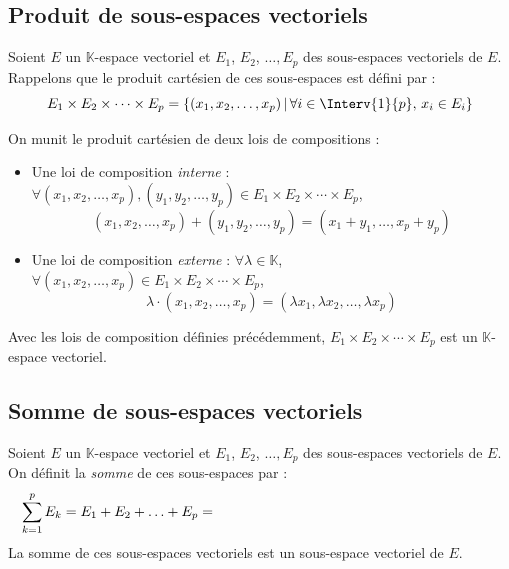 \documentclass[a4paper,10pt]{report}
\begin{document}
\subsection{Produit de sous-espaces vectoriels}

Soient $E$ un $\mathbb{K}$-espace vectoriel et $E_1$, $E_2$, $\ldots, E_p$ des sous-espaces vectoriels de $E$. Rappelons que le produit cartésien de ces sous-espaces est défini par :
$$ E_1 \times E_2 \times \cdots \times E_p = \left\lbrace (x_1, x_2, \ldots, x_p) \, \vert \, \forall i \in \Interv{1}{p}, \, x_i \in E_i \right\rbrace$$

On munit le produit cartésien de deux lois de compositions :

\begin{itemize}
\item Une loi de composition \emph{interne} : $\forall (x_1, x_2, \ldots, x_p), (y_1, y_2, \ldots, y_p) \in E_1 \times E_2 \times \cdots \times E_p$,
$$ (x_1, x_2, \ldots, x_p) + (y_1, y_2, \ldots, y_p) = (x_1+y_1, \ldots, x_p + y_p)$$
\item Une loi de composition \emph{externe} : $\forall \lambda \in \mathbb{K}$, $\forall (x_1, x_2, \ldots, x_p) \in E_1 \times E_2 \times \cdots \times E_p$,
$$ \lambda \cdot (x_1, x_2, \ldots, x_p) = (\lambda x_1, \lambda x_2, \ldots, \lambda x_p)$$
\end{itemize}

\begin{Proposition}{}
Avec les lois de composition définies précédemment, $E_1 \times E_2 \times \cdots \times E_p$ est un $\mathbb{K}$-espace vectoriel.
\end{Proposition}







\subsection{Somme de sous-espaces vectoriels}

\begin{TheoremeDefinition}{}
Soient $E$ un $\mathbb{K}$-espace vectoriel et $E_1$, $E_2$, $\ldots, E_p$ des sous-espaces vectoriels de $E$. On définit la \emph{somme} de ces sous-espaces par :
$$ \sum_{k=1}^p E_k = E_1 + E_2 + \ldots + E_p = \phantom{\left\lbrace \sum_{k=1}^p x_k \, \big{\vert} \, (x_1, x_2, \ldots, x_p) \in E_1 \times E_2 \times \cdots E_p \right\rbrace}$$
La somme de ces sous-espaces vectoriels est un sous-espace vectoriel de $E$.
\end{TheoremeDefinition}
\end{document}
